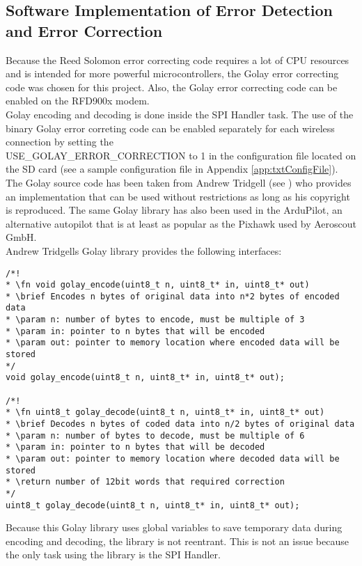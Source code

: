 \subsection{Software Implementation of Error Detection and Error Correction}
Because the Reed Solomon error correcting code requires a lot of CPU resources and is intended for more powerful microcontrollers, the Golay error correcting code was chosen for this project. Also, the Golay error correcting code can be enabled on the RFD900x modem.\\
Golay encoding and decoding is done inside the SPI Handler task. The use of the binary Golay error correting code can be enabled separately for each wireless connection by setting the\\
USE\_GOLAY\_ERROR\_CORRECTION to 1 in the configuration file located on the SD card (see a sample configuration file in Appendix \autoref{app:txtConfigFile}). The Golay source code has been taken from Andrew Tridgell (see \cite{GolaySourceCode}) who provides an implementation that can be used without restrictions as long as his copyright is reproduced. The same Golay library has also been used in the ArduPilot, an alternative autopilot that is at least as popular as the Pixhawk used by Aeroscout GmbH.\\
Andrew Tridgells Golay library provides the following interfaces:
\begin{lstlisting}
/*!
* \fn void golay_encode(uint8_t n, uint8_t* in, uint8_t* out)
* \brief Encodes n bytes of original data into n*2 bytes of encoded data
* \param n: number of bytes to encode, must be multiple of 3
* \param in: pointer to n bytes that will be encoded
* \param out: pointer to memory location where encoded data will be stored
*/
void golay_encode(uint8_t n, uint8_t* in, uint8_t* out);

/*!
* \fn uint8_t golay_decode(uint8_t n, uint8_t* in, uint8_t* out)
* \brief Decodes n bytes of coded data into n/2 bytes of original data
* \param n: number of bytes to decode, must be multiple of 6
* \param in: pointer to n bytes that will be decoded
* \param out: pointer to memory location where decoded data will be stored
* \return number of 12bit words that required correction
*/
uint8_t golay_decode(uint8_t n, uint8_t* in, uint8_t* out);
\end{lstlisting}
Because this Golay library uses global variables to save temporary data during encoding and decoding, the library is not reentrant. This is not an issue because the only task using the library is the SPI Handler.\\
